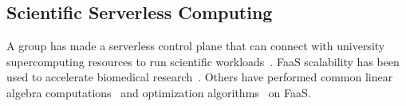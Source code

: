 
\subsection{Scientific Serverless Computing}

A group has made a serverless control plane that can connect with university supercomputing resources to run scientific workloads~\cite{funcx_hpdc_20}.
FaaS scalability has been used to accelerate biomedical research~\cite{kumanov2018serverless,hung2019rapid}.
Others have performed common linear algebra computations~\cite{werner2018serverless,shankar2020serverless} and optimization algorithms~\cite{aytekin2019harnessing} on FaaS.
